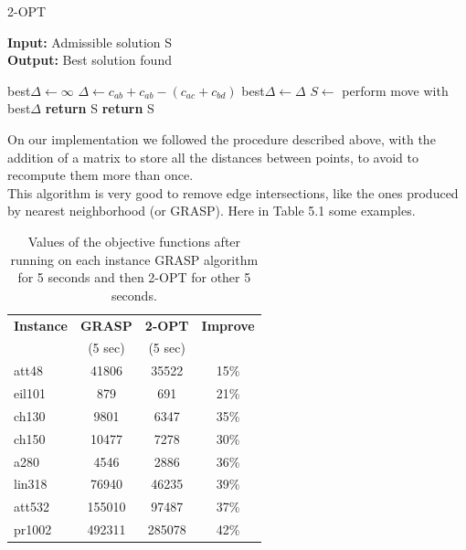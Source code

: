 \begin{algorithm}
	\caption{2-OPT}\label{2-OPT method}
	\hspace*{\algorithmicindent} \textbf{Input:} Admissible solution S \\
	\hspace*{\algorithmicindent} \textbf{Output:} Best solution found
    \begin{algorithmic}[1]
			\State best$\Delta \leftarrow \infty$
				\State $\Delta \leftarrow c_{ab} + c_{ab} - (c_{ac} + c_{bd})$ 
					\State best$\Delta \leftarrow \Delta$
				\EndIf
			\EndFor
				\State $S \leftarrow$ perform move with best$\Delta$
			\Else
				\State \textbf{return} S
			\EndIf
		\EndWhile
		\State \textbf{return} S
    \end{algorithmic}
\end{algorithm}

\noindent On our implementation we followed the procedure described above, with the addition of a matrix to store all the distances between points, to avoid to recompute them more than once.\\
This algorithm is very good to remove edge intersections, like the ones produced  by nearest neighborhood (or GRASP). Here in Table 5.1 some examples.\\ 

\begin{table}[h!]
	\begin{center}
		\begin{tabular}{l|c|c|c}
			\textbf{Instance} & \textbf{GRASP} & \textbf{2-OPT} & \textbf{Improve}	\\
			& (5 sec) & (5 sec) & \\
			\hline
			att48 & 41806 & 35522 & 15\% \\
			eil101 & 879 & 691 & 21\% \\
			ch130 & 9801 & 6347 & 35\% \\
			ch150 & 10477 & 7278 & 30\% \\
			a280 & 4546 & 2886 & 36\% \\
			lin318 & 76940 & 46235 & 39\% \\ 
			att532 & 155010 & 97487 & 37\% \\	
			pr1002 & 492311 & 285078 & 42\% \\
		\end{tabular}
		\caption{Values of the objective functions after running on each instance GRASP algorithm for 5 seconds and then 2-OPT for other 5 seconds.}
	\end{center}
\end{table}


